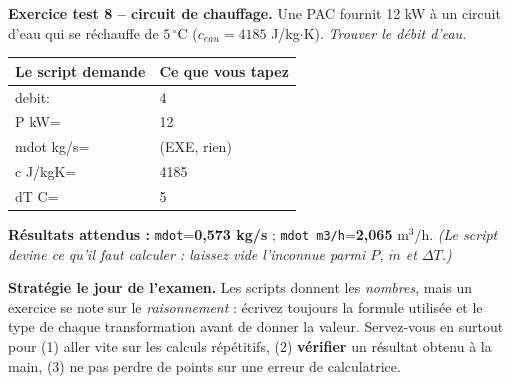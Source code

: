 \documentclass[10.5pt,a4paper]{article}
\makeatletter
\newenvironment{saisie}{%
\begin{center}\small
\begin{tabular}{@{}>{\ttfamily}l l@{}}
\toprule
\textrm{\textbf{Le script demande}} & \textbf{Ce que vous tapez} \\
\midrule
}{%
\bottomrule
\end{tabular}
\end{center}
}
\makeatother
\begin{document}
\begin{test}
\textbf{Exercice test 8 -- circuit de chauffage.} Une PAC fournit 12 kW à un circuit d'eau qui se
réchauffe de $5\,^\circ$C ($c_{eau}=4185$ J/kg$\cdot$K). \emph{Trouver le débit d'eau.}

\begin{saisie}
4 debit: & 4 \\
P kW= & 12 \\
mdot kg/s= & \textrm{(EXE, rien)} \\
c J/kgK= & 4185 \\
dT C= & 5 \\
\end{saisie}

\textbf{Résultats attendus :} \texttt{mdot}=\textbf{0,573 kg/s} ; \texttt{mdot m3/h}=\textbf{2,065}
m$^3$/h. \emph{(Le script devine ce qu'il faut calculer : laissez vide l'inconnue parmi $P$, $\dot m$ et
$\Delta T$.)}
\end{test}

\vspace{0.5cm}
\begin{piege}
\textbf{Stratégie le jour de l'examen.} Les scripts donnent les \emph{nombres}, mais un exercice se note
sur le \emph{raisonnement} : écrivez toujours la formule utilisée et le type de chaque transformation
avant de donner la valeur. Servez-vous en surtout pour (1) aller vite sur les calculs répétitifs,
(2) \textbf{vérifier} un résultat obtenu à la main, (3) ne pas perdre de points sur une erreur de
calculatrice.
\end{piege}
\end{document}
